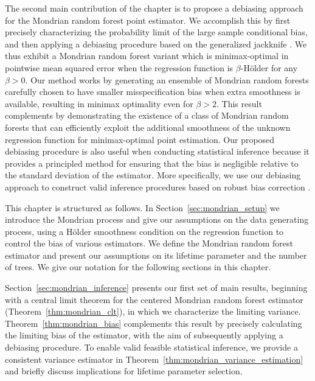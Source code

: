 \documentclass[11pt,lof]{puthesis}
\theoremstyle{break}
\theoremstyle{proof}
\begin{document}
The second main contribution of the chapter is to propose a debiasing approach
for the Mondrian random forest point estimator. We accomplish this by first
precisely characterizing the probability limit of the large sample conditional
bias, and then applying a debiasing procedure based on the generalized
jackknife \citep{schucany1977improvement}. We thus exhibit a Mondrian random
forest variant which is minimax-optimal in pointwise mean squared error when
the regression function is $\beta$-H{\"o}lder for any $\beta > 0$. Our method
works by generating an ensemble of Mondrian random forests carefully chosen to
have smaller misspecification bias when extra smoothness is available,
resulting in minimax optimality even for $\beta > 2$. This result complements
\citet{mourtada2020minimax} by demonstrating the existence of a class of
Mondrian random forests that can efficiently exploit the additional smoothness
of the unknown regression function for minimax-optimal point estimation. Our
proposed debiasing procedure is also useful when conducting statistical
inference because it provides a principled method for ensuring that the bias is
negligible relative to the standard deviation of the estimator. More
specifically, we use our debiasing approach to construct valid inference
procedures based on robust bias correction
\citep{calonico2018effect,calonico2022coverage}.

This chapter is structured as follows. In Section~\ref{sec:mondrian_setup} we
introduce the Mondrian process and give our assumptions on the data generating
process, using a H{\"o}lder smoothness condition on the regression function to
control the bias of various estimators. We define the Mondrian random forest
estimator and present our assumptions on its lifetime parameter and the number
of trees. We give our notation for the following sections in this chapter.

Section~\ref{sec:mondrian_inference} presents our first set of main results,
beginning with a central limit theorem for the centered Mondrian random forest
estimator (Theorem~\ref{thm:mondrian_clt}), in which we characterize the
limiting variance. Theorem~\ref{thm:mondrian_bias} complements this result by
precisely calculating the limiting bias of the estimator, with the aim of
subsequently applying a debiasing procedure. To enable valid feasible
statistical inference, we provide a consistent variance estimator in
Theorem~\ref{thm:mondrian_variance_estimation} and briefly discuss implications
for lifetime parameter selection.
\end{document}

